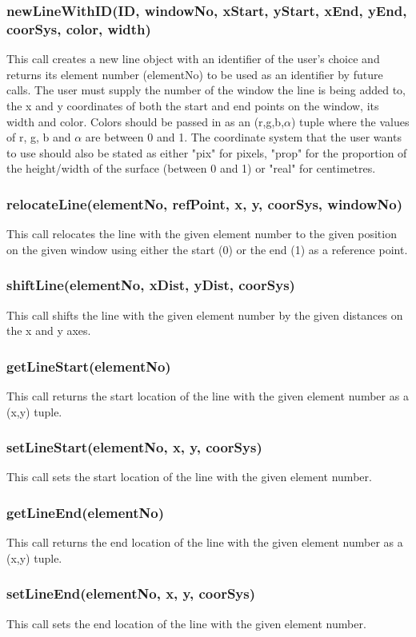 \documentclass{acm_proc_article-sp}
\begin{document}
\subsubsection{newLineWithID(ID, windowNo, xStart, yStart, xEnd, yEnd, coorSys, color, width)}
This call creates a new line object with an identifier of the user's choice and returns its element number (elementNo) to be used as an identifier by future calls. The user must supply the number of the window the line is being added to, the x and y coordinates of both the start and end points on the window, its width and color. Colors should be passed in as an (r,g,b,$\alpha$) tuple where the values of r, g, b and $\alpha$ are between 0 and 1. The coordinate system that the user wants to use should also be stated as either "pix" for pixels, "prop" for the proportion of the height/width of the surface (between 0 and 1) or "real" for centimetres.
\subsubsection{relocateLine(elementNo, refPoint, x, y, coorSys, windowNo)}
This call relocates the line with the given element number to the given position on the given window using either the start (0) or the end (1) as a reference point.
\subsubsection{shiftLine(elementNo, xDist, yDist, coorSys)}
This call shifts the line with the given element number by the given distances on the x and y axes.
\subsubsection{getLineStart(elementNo)}
This call returns the start location of the line with the given element number as a (x,y) tuple.
\subsubsection{setLineStart(elementNo, x, y, coorSys)}
This call sets the start location of the line with the given element number.
\subsubsection{getLineEnd(elementNo)}
This call returns the end location of the line with the given element number as a (x,y) tuple.
\subsubsection{setLineEnd(elementNo, x, y, coorSys)}
This call sets the end location of the line with the given element number.
\end{document}
